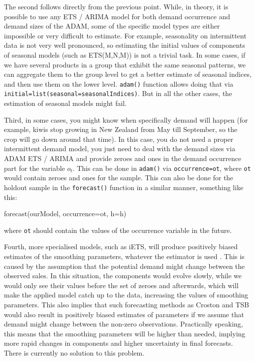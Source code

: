 \documentclass[
]{book}
\newenvironment{Shaded}{\begin{snugshade}}{\end{snugshade}}
\newcommand{\AttributeTok}[1]{\textcolor[rgb]{0.77,0.63,0.00}{#1}}
\newcommand{\FunctionTok}[1]{\textcolor[rgb]{0.00,0.00,0.00}{#1}}
\newcommand{\NormalTok}[1]{#1}
\theoremstyle{definition}
\theoremstyle{definition}
\theoremstyle{definition}
\theoremstyle{definition}
\theoremstyle{remark}
\begin{document}
The second follows directly from the previous point. While, in theory, it is possible to use any ETS / ARIMA model for both demand occurrence and demand sizes of the ADAM, some of the specific model types are either impossible or very difficult to estimate. For example, seasonality on intermittent data is not very well pronounced, so estimating the initial values of components of seasonal models (such as ETS(M,N,M)) is not a trivial task. In some cases, if we have several products in a group that exhibit the same seasonal patterns, we can aggregate them to the group level to get a better estimate of seasonal indices, and then use them on the lower level. \texttt{adam()} function allows doing that via \texttt{initial=list(seasonal=seasonalIndices)}. But in all the other cases, the estimation of seasonal models might fail.

Third, in some cases, you might know when specifically demand will happen (for example, kiwis stop growing in New Zealand from May till September, so the crop will go down around that time). In this case, you do not need a proper intermittent demand model, you just need to deal with the demand sizes via ADAM ETS / ARIMA and provide zeroes and ones in the demand occurrence part for the variable \(o_t\). This can be done in \texttt{adam()} via \texttt{occurrence=ot}, where \texttt{ot} would contain zeroes and ones for the sample. This can also be done for the holdout sample in the \texttt{forecast()} function in a similar manner, something like this:

\begin{Shaded}
\begin{Highlighting}[]
\FunctionTok{forecast}\NormalTok{(ourModel, }\AttributeTok{occurrence=}\NormalTok{ot, }\AttributeTok{h=}\NormalTok{h)}
\end{Highlighting}
\end{Shaded}

where \texttt{ot} should contain the values of the occurrence variable in the future.

Fourth, more specialised models, such as iETS, will produce positively biased estimates of the smoothing parameters, whatever the estimator is used \citep[see explanation in][]{Svetunkov2019a}. This is caused by the assumption that the potential demand might change between the observed sales. In this situation, the components would evolve slowly, while we would only see their values before the set of zeroes and afterwards, which will make the applied model catch up to the data, increasing the values of smoothing parameters. This also implies that such forecasting methods as Croston \citep{Croston1972} and TSB \citep{Teunter2011} would also result in positively biased estimates of parameters if we assume that demand might change between the non-zero observations. Practically speaking, this means that the smoothing parameters will be higher than needed, implying more rapid changes in components and higher uncertainty in final forecasts. There is currently no solution to this problem.
\end{document}
